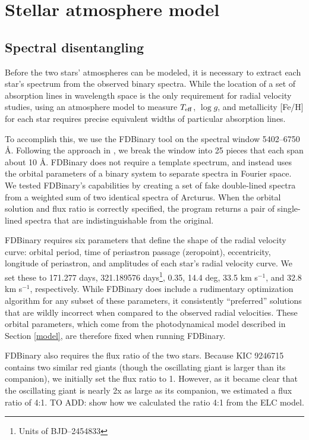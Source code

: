 \section{Stellar atmosphere model}\label{atm}

\subsection{Spectral disentangling}\label{disentangle}
Before the two stars' atmospheres can be modeled, it is necessary to extract each star's spectrum from the observed binary spectra. While the location of a set of absorption lines in wavelength space is the only requirement for radial velocity studies, using an atmosphere model to measure $T_{\rm{eff}}$, $\log g$, and metallicity [Fe/H] for each star requires precise equivalent widths of particular absorption lines.

To accomplish this, we use the FDBinary tool \citep{ili04} on the spectral window 5402--6750 \AA. Following the approach in \citet{bec14}, we break the window into 25 pieces that each span about 10 \AA. FDBinary does not require a template spectrum, and instead uses the orbital parameters of a binary system to separate spectra in Fourier space. We tested FDBinary's capabilities by creating a set of fake double-lined spectra from a weighted sum of two identical spectra of Arcturus. When the orbital solution and flux ratio is correctly specified, the program returns a pair of single-lined spectra that are indistinguishable from the original.

FDBinary requires six parameters that define the shape of the radial velocity curve: orbital period, time of periastron passage (zeropoint), eccentricity, longitude of periastron, and amplitudes of each star's radial velocity curve. We set these to 171.277 days, 321.189576 days\footnote{Units of BJD--2454833}, 0.35, 14.4 deg, 33.5 km s$^{-1}$, and 32.8 km s$^{-1}$, respectively. While FDBinary does include a rudimentary optimization algorithm for any subset of these parameters, it consistently ``preferred'' solutions that are wildly incorrect when compared to the observed radial velocities. These orbital parameters, which come from the photodynamical model described in Section \ref{model}, are therefore fixed when running FDBinary.

FDBinary also requires the flux ratio of the two stars. Because KIC 9246715 contains two similar red giants (though the oscillating giant is larger than its companion), we initially set the flux ratio to 1. However, as it became clear that the oscillating giant is nearly 2x as large as its companion, we estimated a flux ratio of 4:1.
TO ADD: show how we calculated the ratio 4:1 from the ELC model.

